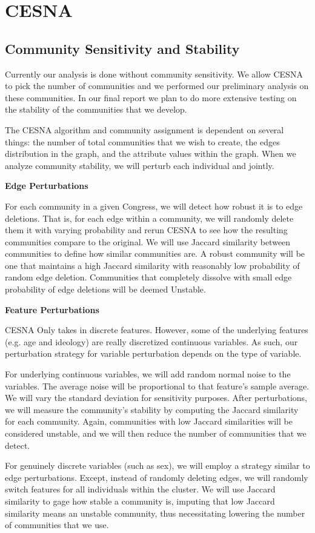 \section{CESNA}

\subsection{Community Sensitivity and Stability}

Currently our analysis is done without community sensitivity. We allow CESNA to
pick the number of communities and we performed our preliminary analysis on
these communities. In our final report we plan to do more extensive testing on
the stability of the communities that we develop.

The CESNA algorithm and community assignment is dependent on several things: the
number of total communities that we wish to create, the edges distribution in
the graph, and the attribute values within the graph. When we analyze community 
stability, we will perturb each individual and jointly.

\textbf{Edge Perturbations}

For each community in a given Congress, we will detect how robust it is to edge 
deletions. That is, for each edge within a community, we will randomly delete 
them it with varying probability and rerun CESNA to see how the resulting 
communities compare to the original. We will use Jaccard similarity between 
communities to define how similar communities are. A robust community will be 
one that maintains a high Jaccard similarity with reasonably low probability of 
random edge deletion. Communities that completely dissolve with small edge 
probability of edge deletions will be deemed Unstable.

\textbf{Feature Perturbations}

CESNA Only takes in discrete features. However, some of the underlying features 
(e.g. age and ideology) are really discretized continuous variables. As such, 
our perturbation strategy for variable perturbation depends on the type of 
variable.

For underlying continuous variables, we will add random normal noise to the
variables. The average noise will be proportional to that feature's sample
average. We will vary the standard deviation for sensitivity purposes. After
perturbations, we will measure the community's stability by computing the
Jaccard similarity for each community. Again, communities with low Jaccard
similarities will be considered unstable, and we will then reduce the number of
communities that we detect.

For genuinely discrete variables (such as sex), we will employ a strategy
similar to edge perturbations. Except, instead of randomly deleting edges, we
will randomly switch features for all individuals within the cluster. We will
use Jaccard similarity to gage how stable a community is, imputing that low 
Jaccard similarity means an unstable community, thus necessitating lowering 
the number of communities that we use.
